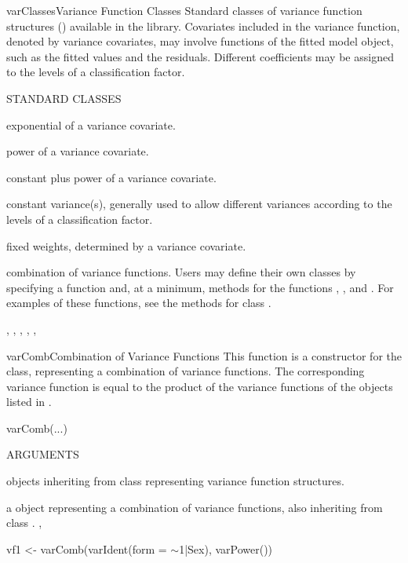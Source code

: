 \documentclass[pdftex]{article} \usepackage{url,graphicx}
\renewcommand{\Twiddle}{\mbox{\(\sim\)}}
\begin{document}
\begin{Helpfile}{varClasses}{Variance Function Classes}
Standard classes of variance function structures () 
available in the  library. Covariates included in the
variance function, denoted by variance covariates, may involve
functions of the fitted model object, such as the fitted values and
the residuals. Different coefficients may be assigned to the levels of
a classification factor.
\begin{Argument}{STANDARD CLASSES}
\item[\Co{varExp:}]
exponential of a variance covariate.
\item[\Co{varPower:}]
power of a variance covariate.
\item[\Co{varConstPower:}]
constant plus power of a variance covariate.
\item[\Co{varIdent:}]
constant variance(s), generally used to allow
different variances according to the levels of a classification
factor.
\item[\Co{varFixed:}]
fixed weights, determined by a variance covariate.
\item[\Co{varComb:}]
combination of variance functions.
 Users may define their own  classes by specifying a
 function and, at a minimum, methods for the
functions , , and . For
examples of these functions, see the methods for class
.
\end{Argument}
, ,
, ,
, 
\end{Helpfile}
\begin{Helpfile}{varComb}{Combination of Variance Functions}
This function is a constructor for the  class,
representing a combination of variance functions. The corresponding
variance function is equal to the product of the variance functions of
the  objects listed in .
\begin{Example}
varComb(...)
\end{Example}
\begin{Argument}{ARGUMENTS}
\item[\Co{...:}]
objects inheriting from class  representing
variance function structures.
\end{Argument}
a  object representing a combination of variance
functions, also inheriting from class .
, 
\need 15pt
\vspace{-16pt} 
\begin{Example}
vf1 <- varComb(varIdent(form = \Twiddle 1|Sex), varPower())
\end{Example}
\end{Helpfile}
\end{document}

